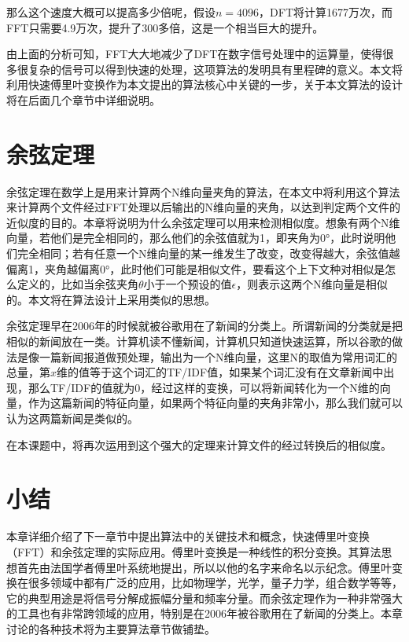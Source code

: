那么这个速度大概可以提高多少倍呢，假设$n=4096$，DFT将计算1677万次，而FFT只需要4.9万次，提升了300多倍，这是一个相当巨大的提升。

由上面的分析可知，FFT大大地减少了DFT在数字信号处理中的运算量，使得很多很复杂的信号可以得到快速的处理，这项算法的发明具有里程碑的意义。本文将利用快速傅里叶变换作为本文提出的算法核心中关键的一步，关于本文算法的设计将在后面几个章节中详细说明。

\section{余弦定理}
\label{sec:cosin}

余弦定理在数学上是用来计算两个N维向量夹角的算法，在本文中将利用这个算法来计算两个文件经过FFT处理以后输出的N维向量的夹角，以达到判定两个文件的近似度的目的。本章将说明为什么余弦定理可以用来检测相似度。想象有两个N维向量，若他们是完全相同的，那么他们的余弦值就为1，即夹角为0°，此时说明他们完全相同；若有任意一个N维向量的某一维发生了改变，改变得越大，余弦值越偏离1，夹角越偏离0°，此时他们可能是相似文件，要看这个上下文种对相似是怎么定义的，比如当余弦夹角$\theta$小于一个预设的值$\epsilon$，则表示这两个N维向量是相似的。本文将在算法设计上采用类似的思想。

余弦定理早在2006年的时候就被谷歌用在了新闻的分类上。所谓新闻的分类就是把相似的新闻放在一类。计算机读不懂新闻，计算机只知道快速运算，所以谷歌的做法是像一篇新闻报道做预处理，输出为一个N维向量，这里N的取值为常用词汇的总量，第$x$维的值等于这个词汇的TF/IDF值，如果某个词汇没有在文章新闻中出现，那么TF/IDF的值就为0，经过这样的变换，可以将新闻转化为一个N维的向量，作为这篇新闻的特征向量，如果两个特征向量的夹角非常小，那么我们就可以认为这两篇新闻是类似的。

在本课题中，将再次运用到这个强大的定理来计算文件的经过转换后的相似度。


\section{小结}
\label{sec:conc}

本章详细介绍了下一章节中提出算法中的关键技术和概念，快速傅里叶变换（FFT）和余弦定理的实际应用。傅里叶变换是一种线性的积分变换。其算法思想首先由法国学者傅里叶系统地提出，所以以他的名字来命名以示纪念。傅里叶变换在很多领域中都有广泛的应用，比如物理学，光学，量子力学，组合数学等等，它的典型用途是将信号分解成振幅分量和频率分量。而余弦定理作为一种非常强大的工具也有非常跨领域的应用，特别是在2006年被谷歌用在了新闻的分类上。本章讨论的各种技术将为主要算法章节做铺垫。
